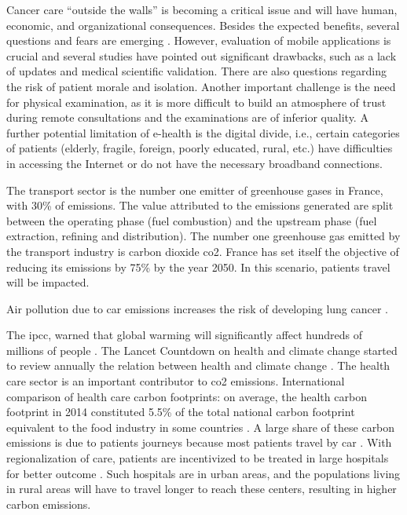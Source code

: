 Cancer care ``outside the walls'' is becoming a critical issue and will have human, economic, and organizational consequences. Besides the expected benefits, several questions and fears are emerging \cite{bertucci_outpatient_2019}. However, evaluation of mobile applications is crucial and several studies have pointed out significant drawbacks, such as a lack of updates and medical scientific validation. There are also questions regarding the risk of patient morale and isolation. Another important challenge is the need for physical examination, as it is more difficult to build an atmosphere of trust during remote consultations and the examinations are of inferior quality. A further potential limitation of e-health is the digital divide, i.e., certain categories of patients (elderly, fragile, foreign, poorly educated, rural, etc.) have difficulties in accessing the Internet or do not have the necessary broadband connections.

The transport sector is the number one emitter of greenhouse gases in France, with 30\% of emissions. The value attributed to the emissions generated are split between the operating phase (fuel combustion) and the upstream phase (fuel extraction, refining and distribution). The number one greenhouse gas emitted by the transport industry is carbon dioxide \ac{co2}.
France has set itself the objective of reducing its emissions by 75\% by the year 2050. In this scenario, patients travel will be impacted.

Air pollution due to car emissions increases the risk of developing lung cancer \cite{raaschou-nielsen_air_2013}.

The \ac{ipcc}, warned that global warming will significantly affect hundreds of millions of people \cite{change_climate_2015}.
The Lancet Countdown on health and climate change started to review annually the relation between health and climate change \cite{watts_2020_2021}.
The health care sector is an important contributor to \ac{co2} emissions. International comparison of health care carbon footprints: on average, the health carbon footprint in 2014 constituted 5.5\% of the total national carbon footprint equivalent to the food industry in some countries \cite{pichler_international_2019}.
A large share of these carbon emissions is due to patients journeys \cite{andrews_carbon_2013,nicolet_what_2022} because most patients travel by car \cite{forner_carbon_2021}. With regionalization of care, patients are incentivized to be treated in large hospitals for better outcome \cite{eskander_health_2016}. Such hospitals are in urban areas, and the populations living in rural areas will have to travel longer to reach these centers, resulting in higher carbon emissions.

